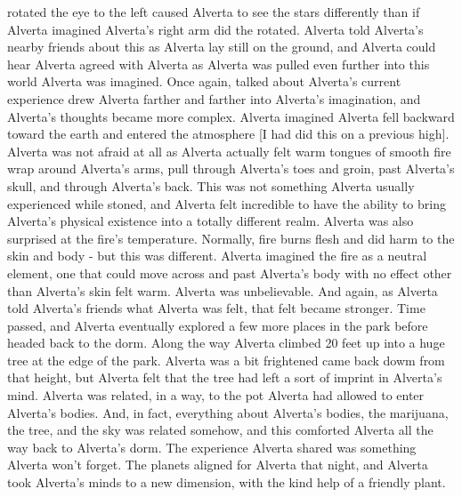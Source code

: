 \documentclass[12pt]{book}
\begin{document}
rotated the eye to the left caused Alverta to see the stars differently than if Alverta imagined Alverta's right arm did the rotated. Alverta told Alverta's nearby friends about this as Alverta lay still on the ground, and Alverta could hear Alverta agreed with Alverta as Alverta was pulled even further into this world Alverta was imagined. Once again, talked about Alverta's current experience drew Alverta farther and farther into Alverta's imagination, and Alverta's thoughts became more complex. Alverta imagined Alverta fell backward toward the earth and entered the atmosphere [I had did this on a previous high]. Alverta was not afraid at all as Alverta actually felt warm tongues of smooth fire wrap around Alverta's arms, pull through Alverta's toes and groin, past Alverta's skull, and through Alverta's back. This was not something Alverta usually experienced while stoned, and Alverta felt incredible to have the ability to bring Alverta's physical existence into a totally different realm. Alverta was also surprised at the fire's temperature. Normally, fire burns flesh and did harm to the skin and body - but this was different. Alverta imagined the fire as a neutral element, one that could move across and past Alverta's body with no effect other than Alverta's skin felt warm. Alverta was unbelievable. And again, as Alverta told Alverta's friends what Alverta was felt, that felt became stronger. Time passed, and Alverta eventually explored a few more places in the park before headed back to the dorm. Along the way Alverta climbed 20 feet up into a huge tree at the edge of the park. Alverta was a bit frightened came back dowm from that height, but Alverta felt that the tree had left a sort of imprint in Alverta's mind. Alverta was related, in a way, to the pot Alverta had allowed to enter Alverta's bodies. And, in fact, everything about Alverta's bodies, the marijuana, the tree, and the sky was related somehow, and this comforted Alverta all the way back to Alverta's dorm. The experience Alverta shared was something Alverta won't forget. The planets aligned for Alverta that night, and Alverta took Alverta's minds to a new dimension, with the kind help of a friendly plant.
\end{document}
